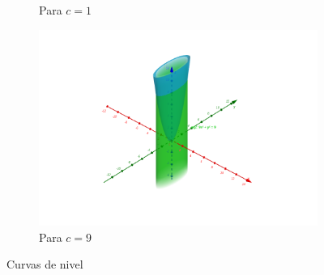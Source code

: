 \documentclass[letterpaper,11pt]{article}
\begin{document}
\begin{enumerate}
\begin{figure}[h!]
\begin{subfigure}{0.3\textwidth}
		\caption{Para $ c = 1 $}
	\end{subfigure}
	\begin{subfigure}{0.3\textwidth}
		\includegraphics[width=\linewidth]{img/1a3}
		\caption{Para $ c = 9 $}
	\end{subfigure}
	\caption{Curvas de nivel }
\end{figure}


\end{enumerate}
\end{document}
